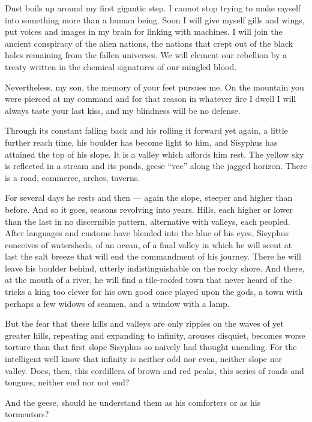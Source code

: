 \documentclass[english,11pt,letterpaper,onecolumn]{scrbook}
\begin{document}
	Dust boils up around my first gigantic step.  I cannot stop trying to make myself into something more than a human being.  Soon I will give myself gills and wings, put voices and images in my brain for linking with machines.  I will join the ancient conspiracy of the alien nations, the nations that crept out of the black holes remaining from the fallen universes.  We will clement our rebellion by a treaty written in the chemical signatures of our mingled blood.

	Nevertheless, my son, the memory of your feet pursues me.  On the mountain you were pierced at my command and for that reason in whatever fire I dwell I will always taste your last kiss, and my blindness will be no defense.

\newpage
{}
	Through its constant falling back and his rolling it forward yet again, a little further reach time, his boulder has become light to him, and Sisyphus has attained the top of his slope.  It is a valley which affords him rest.  The yellow sky is reflected in a stream and its ponds, geese ``vee'' along the jagged horizon.  There is a road, commerce, arches, taverns.

	For several days he rests and then --- again the slope, steeper and higher than before.  And so it goes, seasons revolving into years.  Hills, each higher or lower than the last in no discernible pattern, alternative with valleys, each peopled.  After languages and customs have blended into the blue of his eyes, Sisyphus conceives of watersheds, of an ocean, of a final valley in which he will scent at last the salt breeze that will end the commandment of his journey.  There he will leave his boulder behind, utterly indistinguishable on the rocky shore.  And there, at the mouth of a river, he will find a tile-roofed town that never heard of the tricks a king too clever for his own good once played upon the gods, a town with perhaps a few widows of seamen, and a window with a lamp.

	But the fear that these hills and valleys are only ripples on the waves of yet greater hills, repeating and expanding to infinity, arouses disquiet, becomes worse torture than that first slope Sisyphus so naively had thought unending.  For the intelligent well know that infinity is neither odd nor even, neither slope nor valley.  Does, then, this cordillera of brown and red peaks, this series of roads and tongues, neither end nor not end?

	And the geese, should he understand them as his comforters or as his tormentors?
\date{December 13, 1987...June 1, 1989}
\end{document}
